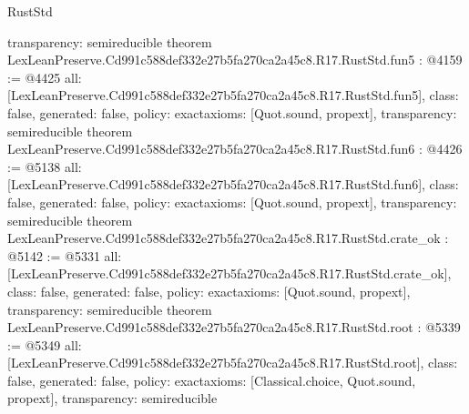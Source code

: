 \begin{lexlean}{RustStd}
\begin{coremodule}
{  transparency: semireducible
}
theorem LexLeanPreserve.Cd991c588def332e27b5fa270ca2a45c8.R17.RustStd.fun5 : @4159 := @4425 {
  all: [LexLeanPreserve.Cd991c588def332e27b5fa270ca2a45c8.R17.RustStd.fun5],
  class: false,
  generated: false,
  policy: exact{axioms: [Quot.sound, propext]},
  transparency: semireducible
}
theorem LexLeanPreserve.Cd991c588def332e27b5fa270ca2a45c8.R17.RustStd.fun6 : @4426 := @5138 {
  all: [LexLeanPreserve.Cd991c588def332e27b5fa270ca2a45c8.R17.RustStd.fun6],
  class: false,
  generated: false,
  policy: exact{axioms: [Quot.sound, propext]},
  transparency: semireducible
}
theorem LexLeanPreserve.Cd991c588def332e27b5fa270ca2a45c8.R17.RustStd.crate_ok : @5142 := @5331 {
  all: [LexLeanPreserve.Cd991c588def332e27b5fa270ca2a45c8.R17.RustStd.crate_ok],
  class: false,
  generated: false,
  policy: exact{axioms: [Quot.sound, propext]},
  transparency: semireducible
}
theorem LexLeanPreserve.Cd991c588def332e27b5fa270ca2a45c8.R17.RustStd.root : @5339 := @5349 {
  all: [LexLeanPreserve.Cd991c588def332e27b5fa270ca2a45c8.R17.RustStd.root],
  class: false,
  generated: false,
  policy: exact{axioms: [Classical.choice, Quot.sound, propext]},
  transparency: semireducible
}


\end{coremodule}
\end{lexlean}
